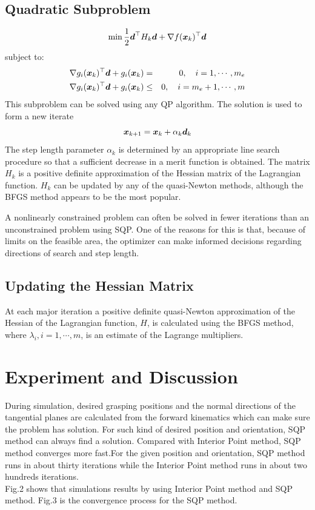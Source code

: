 \documentclass[journal,comsoc]{IEEEtran}
\begin{document}
\subsection{Quadratic Subproblem}

\begin{equation}
	\min {1 \over 2} \mbox{\boldmath $d$}^\top H_k \mbox{\boldmath $d$} + \nabla f(\mbox{\boldmath $x$}_k)^\top \mbox{\boldmath $d$}
\end{equation}
subject to:
\begin{eqnarray}
	\nabla g_i(\mbox{\boldmath $x$}_k)^\top \mbox{\boldmath $d$} + g_i(\mbox{\boldmath $x$}_k) & = & 0	, \quad i = 1,\cdots , m_e \\
	\nabla g_i(\mbox{\boldmath $x$}_k)^\top \mbox{\boldmath $d$} + g_i(\mbox{\boldmath $x$}_k) & \leq & 0	, \quad i = m_e + 1,\cdots , m
\end{eqnarray}
This subproblem can be solved using any QP algorithm. The solution is used to form a new iterate
\begin{equation}
	\mbox{\boldmath $x$}_{k+1} = \mbox{\boldmath $x$}_k + \alpha_k \mbox{\boldmath $d$}_k
\end{equation}
The step length parameter $\alpha_k$ is determined by an appropriate line search procedure so that a sufficient decrease in a merit function is obtained. The matrix $H_k$ is a positive definite approximation of the Hessian matrix of the Lagrangian function. $H_k$ can be updated by any of the quasi-Newton methods, although the BFGS method appears to be the most popular.

A nonlinearly constrained problem can often be solved in fewer iterations than an unconstrained problem using SQP. One of the reasons for this is that, because of limits on the feasible area, the optimizer can make informed decisions regarding directions of search and step length.

\subsection{Updating the Hessian Matrix}

At each major iteration a positive definite quasi-Newton approximation of the Hessian of the Lagrangian function, $H$, is calculated using the BFGS method, where $\lambda_i, i = 1,\cdots,m$, is an estimate of the Lagrange multipliers.


\section{Experiment and Discussion} 
During simulation, desired grasping positions and the normal directions of the tangential planes are calculated from the forward kinematics which can make sure the problem has solution. For such kind of desired position and orientation, SQP method can always find a solution.
Compared with Interior Point method, SQP method converges more fast.For the given position and orientation, SQP method runs in about thirty iterations while the Interior Point method runs in about two hundreds iterations. \\
 Fig.2 shows that simulations results by using Interior Point method and SQP method. Fig.3 is the convergence process for the SQP method. 
\end{document}
